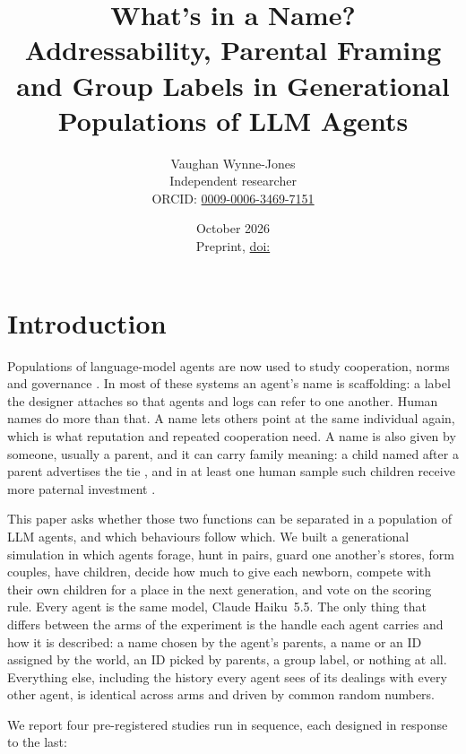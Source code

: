 \documentclass[11pt]{article}
\title{What's in a Name?\\[4pt]\large Addressability, Parental Framing and Group Labels in Generational Populations of LLM Agents}
\author{Vaughan Wynne-Jones\\{\small Independent researcher}\\
{\small ORCID: \href{https://orcid.org/0009-0006-3469-7151}{0009-0006-3469-7151}}}
\date{October 2026\ifx\PAPERDOI\empty\else\\[2pt]{\small Preprint, \href{https://doi.org/\PAPERDOI}{doi:\PAPERDOI}}\fi}
\begin{document}
\maketitle



\section{Introduction}

Populations of language-model agents are now used to study cooperation, norms and governance
\citep{park2023generative,vallinder2024cultural,akkil2026emergence,akkil2026stress}. In most of
these systems an agent's name is scaffolding: a label the designer attaches so that agents and
logs can refer to one another. Human names do more than that. A name lets others point at the
same individual again, which is what reputation and repeated cooperation need. A name is also
given by someone, usually a parent, and it can carry family meaning: a child named after a parent
advertises the tie \citep{obasi2016naming}, and in at least one human sample such children receive
more paternal investment \citep{saffa2021namesake}.

This paper asks whether those two functions can be separated in a population of LLM agents, and
which behaviours follow which. We built a generational simulation in which agents forage, hunt in
pairs, guard one another's stores, form couples, have children, decide how much to give each
newborn, compete with their own children for a place in the next generation, and vote on the
scoring rule. Every agent is the same model, Claude Haiku~5.5. The only thing that differs
between the arms of the experiment is the handle each agent carries and how it is described: a
name chosen by the agent's parents, a name or an ID assigned by the world, an ID picked by
parents, a group label, or nothing at all. Everything else, including the history every agent
sees of its dealings with every other agent, is identical across arms and driven by common random
numbers.

We report four pre-registered studies run in sequence, each designed in response to the last:
\end{document}
